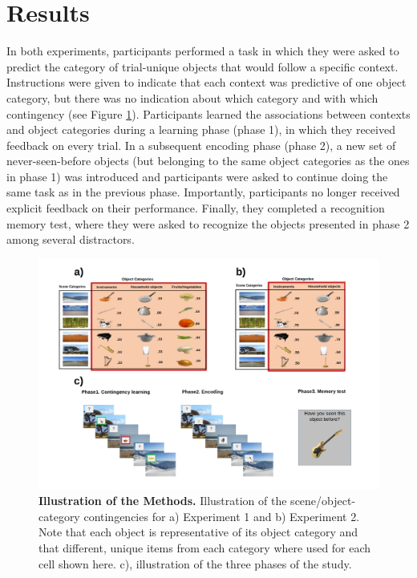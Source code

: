\documentclass[a4paper,12pt]{article}
\begin{document}
\section{Results}
In both experiments, participants performed a task in which they were asked to predict the category of trial-unique objects that would follow a specific context. Instructions were given to indicate that each context was predictive of one object category, but there was no indication about which category and with which contingency (see Figure \ref{fig:Methods}). Participants learned the associations between contexts and object categories during a learning phase (phase 1), in which they received feedback on every trial. In a subsequent encoding phase (phase 2), a new set of never-seen-before objects (but belonging to the same object categories as the ones in phase 1) was introduced and participants were asked to continue doing the same task as in the previous phase. Importantly, participants no longer received explicit feedback on their performance. Finally, they completed a recognition memory test, where they were asked to recognize the objects presented in phase 2 among several distractors.

\begin{figure}[ht!]
\centerline
{\includegraphics[width=1.3\textwidth]{figures/methods.All.jpg}}
\caption{\textbf{Illustration of the Methods.} Illustration of the scene/object-category contingencies  for a) Experiment 1 and b) Experiment 2. Note that each object is representative of its object category and that different, unique items from each category where used for each cell shown here. c), illustration of the three phases of the study. }
\label{fig:Methods}
\end{figure}
\end{document}
